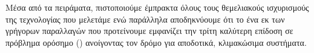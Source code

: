 Μέσα από τα πειράματα, πιστοποιούμε έμπρακτα όλους τους θεμελιακούς ισχυρισμούς της τεχνολογίας που μελετάμε ενώ παράλληλα αποδηκνύουμε ότι το ένα εκ των γρήγορων παραλλαγών που προτείνουμε εμφανίζει την τρίτη καλύτερη επίδοση σε πρόβλημα ορόσημο () ανοίγοντας τον δρόμο για αποδοτικά, κλιμακώσιμα συστήματα.






